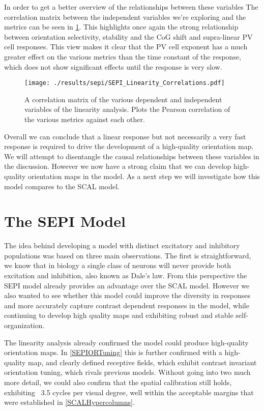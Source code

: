 In order to get a better overview of the relationships between these
variables The correlation matrix between the independent variables
we're exploring and the metrics can be seen in
\ref{SEPILinearityCorr}. This highlights once again the strong
relationship between orientation selectivity, stability and the CoG
shift and supra-linear PV cell responses. This view makes it clear
that the PV cell exponent has a much greater effect on the various
metrics than the time constant of the response, which does not show
significant effects until the response is very slow.

\begin{figure}
	\centering
        \texttt{[image: ./results/sepi/SEPI\_Linearity\_Correlations.pdf]}
	\caption{A correlation matrix of the various dependent and
      independent variables of the linearity analysis. Plots the
      Pearson correlation of the various metrics against each other.}
	\label{SEPILinearityCorr}
\end{figure}

Overall we can conclude that a linear response but not necessarily a
very fast response is required to drive the development of a
high-quality orientation map. We will attempt to disentangle the
causal relationships between these variables in the
discussion. However we now have a strong claim that we can develop
high-quality orientation maps in the model. As a next step we will
investigate how this model compares to the SCAL model.

\section{The SEPI Model}

The idea behind developing a model with distinct excitatory and
inhibitory populations was based on three main observations. The first
is straightforward, we know that in biology a single class of neurons
will never provide both excitation and inhibition, also known as
Dale's law. From this perspective the SEPI model already provides an
advantage over the SCAL model. However we also wanted to see whether
this model could improve the diversity in responses and more
accurately capture contrast dependent responses in the model, while
continuing to develop high quality maps and exhibiting robust and
stable self-organization.

The linearity analysis already confirmed the model could produce
high-quality orientation maps. In \ref{SEPIORTuning} this is further
confirmed with a high-quality map, and clearly defined receptive
fields, which exhibit contrast invariant orientation tuning, which
rivals previous models. Without going into two much more detail, we
could also confirm that the spatial calibration still holds,
exhibiting ~3.5 cycles per visual degree, well within the acceptable
margins that were established in \ref{SCALHypercolumns}.

